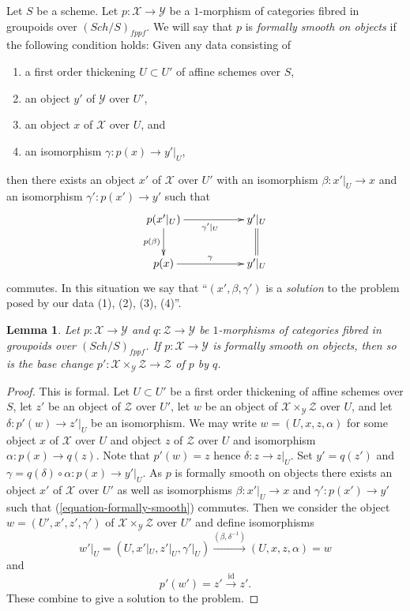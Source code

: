 \documentclass{stacks-project}
\theoremstyle{plain}
\newtheorem{lemma}[subsection]{Lemma}
\theoremstyle{definition}
\theoremstyle{remark}
\numberwithin{equation}{subsection}
\def\Sch{\mathit{Sch}}
\begin{document}
\noindent
Let $S$ be a scheme. Let $p : \mathcal{X} \to \mathcal{Y}$ be a $1$-morphism
of categories fibred in groupoids over $(\Sch/S)_{fppf}$. We will say that
$p$ is {\it formally smooth on objects} if the following condition holds:
Given any data consisting of
\begin{enumerate}
\item a first order thickening $U \subset U'$ of affine schemes over $S$,
\item an object $y'$ of $\mathcal{Y}$ over $U'$,
\item an object $x$ of $\mathcal{X}$ over $U$, and
\item an isomorphism $\gamma : p(x) \to y'|_U$,
\end{enumerate}
then there exists an object $x'$ of
$\mathcal{X}$ over $U'$ with an isomorphism
$\beta : x'|_U \to x$ and an isomorphism $\gamma' : p(x') \to y'$
such that
\begin{equation}
\label{equation-formally-smooth}
\vcenter{
\xymatrix{
p(x'|_U) \ar[d]_{p(\beta)} \ar[rr]_{\gamma'|_U} & &
y'|_U \ar@{=}[d] \\
p(x) \ar[rr]^\gamma & & y'|_U
}
}
\end{equation}
commutes.  In this situation we say that ``$(x', \beta, \gamma')$
is a {\it solution} to the problem posed by our data (1), (2), (3), (4)''.

\begin{lemma}
\label{lemma-base-change-formally-smooth}
Let $p : \mathcal{X} \to \mathcal{Y}$ and $q : \mathcal{Z} \to \mathcal{Y}$
be $1$-morphisms of categories fibred in groupoids over $(\Sch/S)_{fppf}$.
If $p : \mathcal{X} \to \mathcal{Y}$ is formally smooth on objects, then so
is the base change
$p' : \mathcal{X} \times_\mathcal{Y} \mathcal{Z} \to \mathcal{Z}$
of $p$ by $q$.
\end{lemma}

\begin{proof}
This is formal. Let $U \subset U'$ be a first order thickening
of affine schemes over $S$, let $z'$ be an object of $\mathcal{Z}$
over $U'$, let $w$ be an object of
$\mathcal{X} \times_\mathcal{Y} \mathcal{Z}$ over $U$, and let
$\delta : p'(w) \to z'|_U$ be an isomorphism.
We may write
$w = (U, x, z, \alpha)$ for some object $x$ of $\mathcal{X}$ over $U$
and object $z$ of $\mathcal{Z}$ over $U$ and isomorphism
$\alpha : p(x) \to q(z)$. Note that $p'(w) = z$ hence
$\delta : z \to z|_U$. Set $y' = q(z')$ and
$\gamma = q(\delta) \circ \alpha : p(x) \to y'|_U$.
As $p$ is formally smooth on objects there exists an
object $x'$ of $\mathcal{X}$ over $U'$ as well as
isomorphisms $\beta : x'|_U \to x$ and $\gamma' : p(x') \to y'$ such that
(\ref{equation-formally-smooth}) commutes. Then we consider the object
$w = (U', x', z', \gamma')$ of $\mathcal{X} \times_\mathcal{Y} \mathcal{Z}$
over $U'$ and define isomorphisms
$$
w'|_U = (U, x'|_U, z'|_U, \gamma'|_U)
\xrightarrow{(\beta, \delta^{-1})}
(U, x, z, \alpha) = w
$$
and
$$
p'(w') = z' \xrightarrow{\text{id}} z'.
$$
These combine to give a solution to the problem.
\end{proof}
\end{document}
